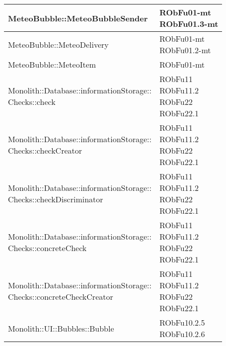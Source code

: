 \begin{center}
\begin{longtable}{|
*{1}{>{\centering\arraybackslash}m{7.5cm}|}
*{1}{>{\centering\arraybackslash}m{2.5cm}|}}
MeteoBubble::MeteoBubbleSender & \makecell{RObFu01-mt
\\RObFu01.3-mt
\\}\\\hline
MeteoBubble::MeteoDelivery & \makecell{RObFu01-mt
\\RObFu01.2-mt
\\}\\\hline
MeteoBubble::MeteoItem & \makecell{RObFu01-mt
\\}\\\hline
\makecell[l]{Monolith::Database::informationStorage:: \\ \hfill Checks::check} & \makecell{RObFu11
\\RObFu11.2
\\RObFu22
\\RObFu22.1
\\}\\\hline
\makecell[l]{Monolith::Database::informationStorage:: \\ \hfill Checks::checkCreator} & \makecell{RObFu11
\\RObFu11.2
\\RObFu22
\\RObFu22.1
\\}\\\hline
\makecell[l]{Monolith::Database::informationStorage:: \\ \hfill Checks::checkDiscriminator} & \makecell{RObFu11
\\RObFu11.2
\\RObFu22
\\RObFu22.1
\\}\\\hline
\makecell[l]{Monolith::Database::informationStorage:: \\ \hfill Checks::concreteCheck} & \makecell{RObFu11
\\RObFu11.2
\\RObFu22
\\RObFu22.1
\\}\\\hline
\makecell[l]{Monolith::Database::informationStorage:: \\ \hfill Checks::concreteCheckCreator} & \makecell{RObFu11
\\RObFu11.2
\\RObFu22
\\RObFu22.1
\\}\\\hline
Monolith::UI::Bubbles::Bubble & \makecell{RObFu10.2.5
\\RObFu10.2.6
}
\end{longtable}
\end{center}

